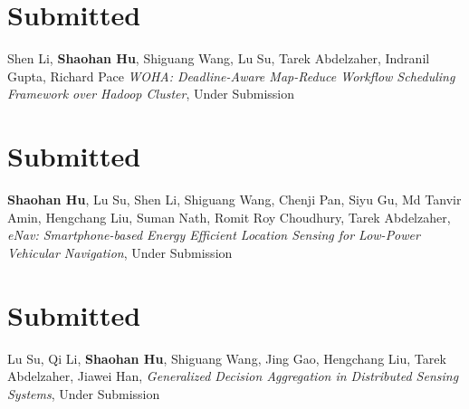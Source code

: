 \section{\sc Submitted}\hypertarget{li2014moha}{}
Shen Li, \textbf{Shaohan Hu}, Shiguang Wang, Lu Su, Tarek Abdelzaher, Indranil Gupta, Richard Pace \emph{WOHA: Deadline-Aware Map-Reduce Workflow Scheduling Framework over Hadoop Cluster}, \textsf{Under Submission} %

\section{\sc Submitted}\hypertarget{hu2014mobisys}{}
\textbf{Shaohan Hu}, Lu Su, Shen Li, Shiguang Wang, Chenji Pan, Siyu Gu, Md Tanvir Amin,
Hengchang Liu, Suman Nath, Romit Roy Choudhury, Tarek Abdelzaher, \emph{eNav:
  Smartphone-based Energy Efficient Location Sensing for Low-Power
  Vehicular Navigation}, \textsf{Under Submission} %

\section{\sc Submitted}\hypertarget{su2014ipsn}{}
Lu Su, Qi Li, \textbf{Shaohan Hu}, Shiguang Wang, Jing Gao, Hengchang
Liu, Tarek Abdelzaher, Jiawei Han, \emph{Generalized Decision
  Aggregation in Distributed Sensing Systems}, \textsf{Under
  Submission} %
